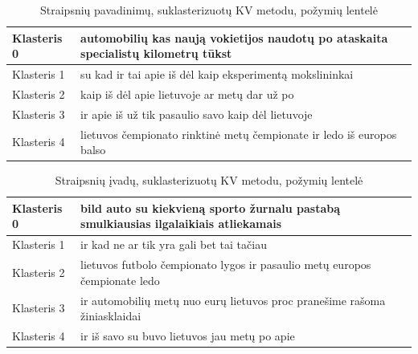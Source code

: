 \documentclass{VUMIFInfBakalaurinis}
\begin{document}
\begin{table}[H]
  \centering
  \caption{Straipsnių pavadinimų, suklasterizuotų KV metodu, požymių lentelė}
  \label{titletable}
  \small
  \begin{tabular}{|l|l|}
  \hline
  Klasteris 0 & automobilių kas naują vokietijos naudotų po ataskaita specialistų kilometrų tūkst \\ \hline
  Klasteris 1 & su kad ir tai apie iš dėl kaip eksperimentą mokslininkai                          \\ \hline
  Klasteris 2 & kaip iš dėl apie lietuvoje ar metų dar už po                                      \\ \hline
  Klasteris 3 & ir apie iš už tik pasaulio savo kaip dėl lietuvoje                                \\ \hline
  Klasteris 4 & lietuvos čempionato rinktinė metų čempionate ir ledo iš europos balso             \\ \hline
  \end{tabular}
  \normalsize
\end{table}

\begin{table}[H]
  \centering
  \caption{Straipsnių įvadų, suklasterizuotų KV metodu, požymių lentelė}
  \small
  \begin{tabular}{|l|l|}
  \hline
  Klasteris 0 & bild auto su kiekvieną sporto žurnalu pastabą smulkiausias ilgalaikiais atliekamais \\ \hline
  Klasteris 1 & ir kad ne ar tik yra gali bet tai tačiau                                            \\ \hline
  Klasteris 2 & lietuvos futbolo čempionato lygos ir pasaulio metų europos čempionate ledo          \\ \hline
  Klasteris 3 & ir automobilių metų nuo eurų lietuvos proc pranešime rašoma žiniasklaidai           \\ \hline
  Klasteris 4 & ir iš savo su buvo lietuvos jau metų po apie                                        \\ \hline
  \end{tabular}
  \normalsize
\end{table}
\end{document}
